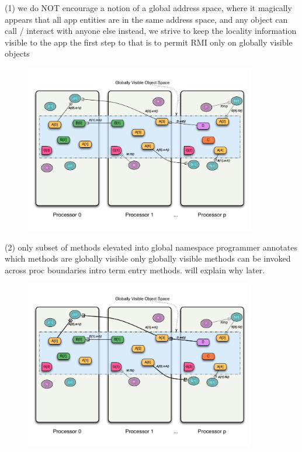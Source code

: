 \begin{frame}
(1) we do NOT encourage a notion of a global address space, where it magically appears that
all app entities are in the same address space, and any object can call / interact with anyone else
instead, we strive to keep the locality information visible to the app
the first step to that is to permit RMI only on globally visible objects
  \begin{figure}\includegraphics[width=0.9\textwidth]{../figures/progmodel/10-rmi-notgas.pdf}\end{figure}
\end{frame}


\begin{frame}
(2) only subset of methods elevated into global namespace
programmer annotates which methods are globally visible
only globally visible methods can be invoked across proc boundaries
intro term entry methods. will explain why later.
  \begin{figure}\includegraphics[width=0.9\textwidth]{../figures/progmodel/11-global-methods.pdf}\end{figure}
\end{frame}


